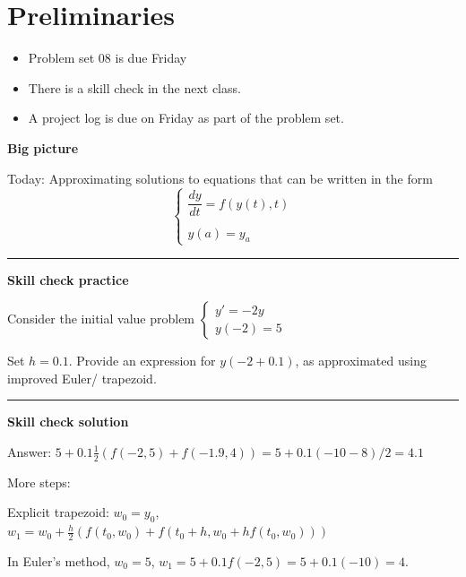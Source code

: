\documentclass[12pt,letterpaper,noanswers]{exam}
\begin{document}
 \pdfpageheight 11in 
  \pdfpagewidth 8.5in

\noindent 

\section*{Preliminaries}

\begin{itemize}
\itemsep0pt
\item Problem set 08 is due Friday
\item There is a skill check in the next class.
\item A project log is due on Friday as part of the problem set.
\end{itemize}


\noindent\textbf{Big picture}

Today: Approximating solutions to equations that can be written in the form \[\displaystyle\left\{\begin{array}{l}\dfrac{dy}{dt} = f(y(t),t) \\
\\
y(a) = y_a\end{array}\right.\]

\vspace{0.2cm}
\hrule
\vspace{0.2cm}

\noindent \textbf{Skill check practice}

\item Consider the initial value problem $\left\{\begin{array}{l}
y' = -2y \\
y(-2) = 5
\end{array}
\right.$

Set $h = 0.1$.  Provide an expression for $y(-2+0.1)$, as approximated using improved Euler/ trapezoid.




\vspace{0.2cm}
\hrule
\vspace{0.2cm}

\noindent \textbf{Skill check solution}

Answer: $5 + 0.1 \frac{1}{2}(f(-2,5) +f(-1.9,4)) = 5+0.1(-10-8)/2 = 4.1$

More steps:

Explicit trapezoid:
$w_0 = y_0$, $w_1 = w_0 + \frac{h}{2}\left(f(t_0,w_0) + f\left(t_0+h, w_0 + hf(t_0,w_0)\right)\right)$


In Euler's method, $w_0 = 5$, $w_1 = 5 + 0.1f(-2,5) = 5+0.1(-10) = 4$.
\end{document}
